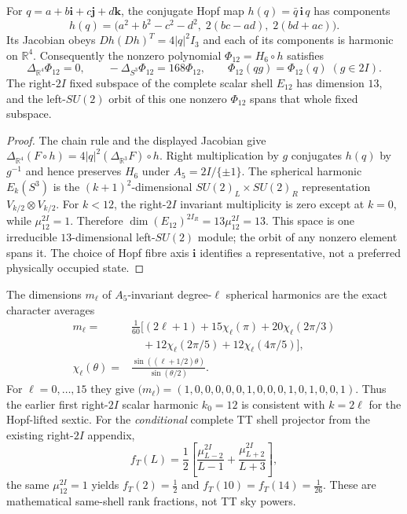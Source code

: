 \documentclass[12pt,a4paper]{article}
\begin{document}
\begin{theorem}
\label{p6c:thm:v322-right2i-hopf-lift}
For $q=a+b\mathbf i+c\mathbf j+d\mathbf k$, the conjugate Hopf map
$h(q)=\bar q\,\mathbf i\,q$ has components
\[
 h(q)=\big(a^2+b^2-c^2-d^2,\;2(bc-ad),\;2(bd+ac)\big).
\]
Its Jacobian obeys $Dh(Dh)^T=4|q|^2I_3$ and each of its components is
harmonic on $\mathbb R^4$.  Consequently the nonzero polynomial
$\Phi_{12}=H_6\circ h$ satisfies
\[
 \Delta_{\mathbb R^4}\Phi_{12}=0,\qquad
 -\Delta_{S^3}\Phi_{12}=168\Phi_{12},\qquad
 \Phi_{12}(qg)=\Phi_{12}(q)\;(g\in2I).
\]
The right-$2I$ fixed subspace of the complete scalar shell $E_{12}$
has dimension $13$, and the left-$SU(2)$ orbit of this one nonzero
$\Phi_{12}$ spans that whole fixed subspace.
\end{theorem}
\begin{proof}
The chain rule and the displayed Jacobian give
$\Delta_{\mathbb R^4}(F\circ h)=4|q|^2(\Delta_{\mathbb R^3}F)\circ h$.
Right multiplication by $g$ conjugates $h(q)$ by $g^{-1}$ and hence
preserves $H_6$ under $A_5=2I/\{\pm1\}$.
The spherical harmonic $E_k(S^3)$ is the $(k+1)^2$-dimensional
$SU(2)_L\times SU(2)_R$ representation $V_{k/2}\otimes V_{k/2}$.
For $k<12$, the right-$2I$ invariant multiplicity is zero except at
$k=0$, while $\mu_{12}^{2I}=1$.  Therefore
$\dim(E_{12})^{2I_R}=13\mu_{12}^{2I}=13$.
This space is one irreducible $13$-dimensional left-$SU(2)$ module;
the orbit of any nonzero element spans it.
The choice of Hopf fibre axis $\mathbf i$ identifies a representative,
not a preferred physically occupied state.
\end{proof}

\begin{proposition}
\label{p6c:prop:v322-right2i-tensor-ranks}
The dimensions $m_\ell$ of $A_5$-invariant degree-$\ell$ spherical
harmonics are the exact character averages
\[
 \begin{aligned}
 m_\ell={}&\frac1{60}\bigl[(2\ell+1)+15\chi_\ell(\pi)
 +20\chi_\ell(2\pi/3)\\
 &\quad+12\chi_\ell(2\pi/5)+12\chi_\ell(4\pi/5)\bigr],\\
 \chi_\ell(\theta)={}&\frac{\sin((\ell+1/2)\theta)}{\sin(\theta/2)}.
 \end{aligned}
\]
For $\ell=0,\ldots,15$ they give
$\big(m_\ell\big)=(1,0,0,0,0,0,1,0,0,0,1,0,1,0,0,1)$.
Thus the earlier first right-$2I$ scalar harmonic $k_0=12$ is
consistent with $k=2\ell$ for the Hopf-lifted sextic.
For the \emph{conditional} complete TT shell projector from the
existing right-$2I$ appendix,
\[
 f_T(L)=\frac12\left[\frac{\mu_{L-2}^{2I}}{L-1}
                  +\frac{\mu_{L+2}^{2I}}{L+3}\right],
\]
the same $\mu_{12}^{2I}=1$ yields
$ f_T(2)=\frac12$ and $f_T(10)=f_T(14)=\frac1{26}$.
These are mathematical same-shell rank fractions, not TT sky powers.
\end{proposition}
\end{document}
